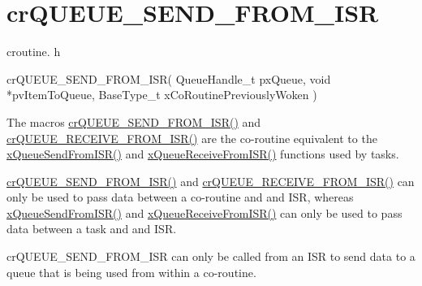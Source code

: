 \hypertarget{group__cr_q_u_e_u_e___s_e_n_d___f_r_o_m___i_s_r}{}\section{cr\+Q\+U\+E\+U\+E\+\_\+\+S\+E\+N\+D\+\_\+\+F\+R\+O\+M\+\_\+\+I\+SR}
\label{group__cr_q_u_e_u_e___s_e_n_d___f_r_o_m___i_s_r}
croutine. h 
\begin{DoxyPre}
crQUEUE\_SEND\_FROM\_ISR(
                         QueueHandle\_t pxQueue,
                         void *pvItemToQueue,
                         BaseType\_t xCoRoutinePreviouslyWoken
                    )
\end{DoxyPre}


The macro\textquotesingle{}s \hyperlink{vendor_2ceedling_2plugins_2freertos_2src_2freertos_2include_2croutine_8h_ac8eb0a81c5cf69de7e4edd73ce44a3be}{cr\+Q\+U\+E\+U\+E\+\_\+\+S\+E\+N\+D\+\_\+\+F\+R\+O\+M\+\_\+\+I\+S\+R()} and \hyperlink{vendor_2ceedling_2plugins_2freertos_2src_2freertos_2include_2croutine_8h_a9c0fa977ca69adbddb4811affa2a71f7}{cr\+Q\+U\+E\+U\+E\+\_\+\+R\+E\+C\+E\+I\+V\+E\+\_\+\+F\+R\+O\+M\+\_\+\+I\+S\+R()} are the co-\/routine equivalent to the \hyperlink{externals_2freertos_2include_2queue_8h_a21d5919ed26c21d121df4a4debeb643c}{x\+Queue\+Send\+From\+I\+S\+R()} and \hyperlink{externals_2freertos_2include_2queue_8h_acdf528f5c91131ae2f31c669cfd65758}{x\+Queue\+Receive\+From\+I\+S\+R()} functions used by tasks.

\hyperlink{vendor_2ceedling_2plugins_2freertos_2src_2freertos_2include_2croutine_8h_ac8eb0a81c5cf69de7e4edd73ce44a3be}{cr\+Q\+U\+E\+U\+E\+\_\+\+S\+E\+N\+D\+\_\+\+F\+R\+O\+M\+\_\+\+I\+S\+R()} and \hyperlink{vendor_2ceedling_2plugins_2freertos_2src_2freertos_2include_2croutine_8h_a9c0fa977ca69adbddb4811affa2a71f7}{cr\+Q\+U\+E\+U\+E\+\_\+\+R\+E\+C\+E\+I\+V\+E\+\_\+\+F\+R\+O\+M\+\_\+\+I\+S\+R()} can only be used to pass data between a co-\/routine and and I\+SR, whereas \hyperlink{externals_2freertos_2include_2queue_8h_a21d5919ed26c21d121df4a4debeb643c}{x\+Queue\+Send\+From\+I\+S\+R()} and \hyperlink{externals_2freertos_2include_2queue_8h_acdf528f5c91131ae2f31c669cfd65758}{x\+Queue\+Receive\+From\+I\+S\+R()} can only be used to pass data between a task and and I\+SR.

cr\+Q\+U\+E\+U\+E\+\_\+\+S\+E\+N\+D\+\_\+\+F\+R\+O\+M\+\_\+\+I\+SR can only be called from an I\+SR to send data to a queue that is being used from within a co-\/routine.

